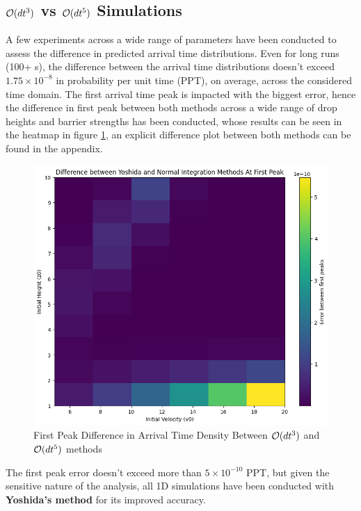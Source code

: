 \subsection{$\mathcal{O}(dt^3)$ vs $\mathcal{O}(dt^5)$ Simulations}

A few experiments across a wide range of parameters have been conducted to assess the difference in predicted arrival time distributions. Even for long runs (100+ s), the difference between the arrival time distributions doesn't exceed $1.75 \times 10^{-8}$ in probability per unit time (PPT), on average, across the considered time domain. The first arrival time peak is impacted with the biggest error, hence the difference in first peak between both methods across a wide range of drop heights and barrier strengths has been conducted, whose results can be seen in the heatmap in figure \ref{fig:difference_wide_parameters}, an explicit difference plot between both methods can be found in the appendix.

\begin{figure}
    \centering
    \includegraphics[width=1\linewidth]{Figures//Yoshida/70d7857a-0990-4979-969a-5731ac2add2b.png}
    \caption{First Peak Difference in Arrival Time Density Between $\mathcal{O}(dt^3)$ and $\mathcal{O}(dt^5)$ methods}
\label{fig:difference_wide_parameters}
\end{figure}

The first peak error doesn't exceed more than $5 \times 10^{-10}$ PPT, but given the sensitive nature of the analysis, all 1D simulations have been conducted with \textbf{Yoshida's method} for its improved accuracy.

